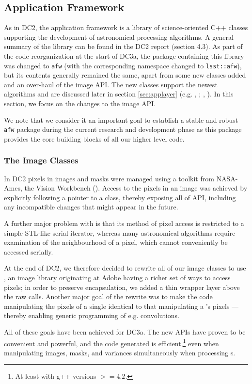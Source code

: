 \subsection{Application Framework}

As in DC2, the application framework is a library of
science-oriented C++ classes supporting the development of
astronomical processing algorithms.  A general summary of the library
can be found in the DC2 report (section 4.3).  As part of the code
reorganization at the start of DC3a, the package containing this
library was changed to {\tt afw} (with the corresponding namespace 
changed to {\tt lsst::afw}), but its contents generally remained the
same, apart from some new classes added and an over-haul of the image
API.  The new classes support the newest algorithms and are discussed
later in section \ref{sec:applayer} (e.g. ,
; , ).  In this section, we
focus on the changes to the image API.  

We note that we consider it an important goal to establish a stable
and robust {\tt afw} package during the current research and
development phase as this package provides the core building blocks of
all our higher level code.

\subsubsection{The Image Classes}
\label{secImageClasses}

In DC2 pixels in images and masks were managed using a toolkit from NASA-Ames, the Vision Workbench ().
Access to the pixels in an image was achieved by explicitly following a pointer to a  class,
thereby exposing all of  API, including any incompatible changes that might appear in
the future.

A further major problem with  is that its method of pixel access is restricted to a simple
STL-like serial iterator, whereas many astronomical algorithms require examination of the neighbourhood of
a pixel, which cannot conveniently be accessed serially.

At the end of DC2, we therefore decided to rewrite all of our image classes to use ,
an image library originating at Adobe having a richer set of ways to access pixels;  in
order to preserve encapsulation, we added a thin wrapper layer above the raw  calls.
Another major goal of the rewrite was to make the code manipulating the pixels of a single
 identical to that manipulating a 's pixels --- thereby enabling
generic programming of e.g. convolutions.

All of these goals have been achieved for DC3a.  The new APIs have proven to be convenient and
powerful, and the code generated is efficient,\footnote{At least with g++ versions $>= 4.2$.} even when
manipulating images, masks, and variances simultaneously when processing s.

